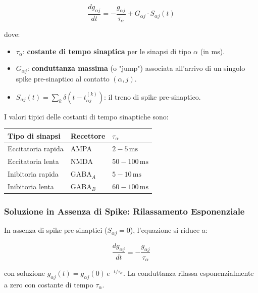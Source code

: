 \begin{equation}
\frac{d g_{\alpha j}}{dt} = -\frac{g_{\alpha j}}{\tau_\alpha} + G_{\alpha j} \cdot S_{\alpha j}(t)
\end{equation}

dove:
\begin{itemize}
    \item $\tau_\alpha$: \textbf{costante di tempo sinaptica} per le sinapsi di tipo $\alpha$ (in ms).
    \item $G_{\alpha j}$: \textbf{conduttanza massima} (o "jump") associata all'arrivo di un singolo spike pre-sinaptico al contatto $(\alpha, j)$.
    \item $S_{\alpha j}(t) = \sum_k \delta(t - t_{\alpha j}^{(k)})$: il treno di spike pre-sinaptico.
\end{itemize}

I valori tipici delle costanti di tempo sinaptiche sono:

\begin{table}[htbp]
    \centering
    \renewcommand{\arraystretch}{1.3}
    \begin{tabularx}{\textwidth}{|X|l|l|}
    \hline
    \textbf{Tipo di sinapsi} & \textbf{Recettore} & \textbf{$\tau_\alpha$} \\
    \hline
    Eccitatoria rapida & AMPA & $2-5\,\text{ms}$ \\
    \hline
    Eccitatoria lenta & NMDA & $50-100\,\text{ms}$ \\
    \hline
    Inibitoria rapida & GABA$_A$ & $5-10\,\text{ms}$ \\
    \hline
    Inibitoria lenta & GABA$_B$ & $60-100\,\text{ms}$ \\
    \hline
    \end{tabularx}
\end{table}

\subsubsection{Soluzione in Assenza di Spike: Rilassamento Esponenziale}

In assenza di spike pre-sinaptici ($S_{\alpha j} = 0$), l'equazione si riduce a:

\begin{equation}
\frac{d g_{\alpha j}}{dt} = -\frac{g_{\alpha j}}{\tau_\alpha}
\end{equation}

con soluzione $g_{\alpha j}(t) = g_{\alpha j}(0)\,e^{-t/\tau_\alpha}$. La conduttanza rilassa esponenzialmente a zero con costante di tempo $\tau_\alpha$.

